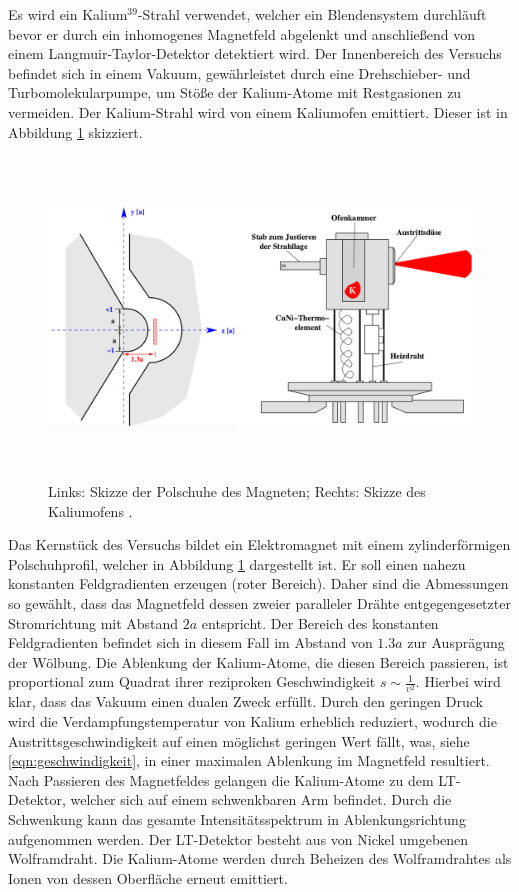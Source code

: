 Es wird ein Kalium$^{39}$-Strahl verwendet, welcher ein Blendensystem durchläuft bevor er durch ein inhomogenes Magnetfeld abgelenkt und anschließend von einem Langmuir-Taylor-Detektor detektiert wird.
Der Innenbereich des Versuchs befindet sich in einem Vakuum, gewährleistet durch eine Drehschieber- und Turbomolekularpumpe, um Stöße der Kalium-Atome mit Restgasionen zu vermeiden.
Der Kalium-Strahl wird von einem Kaliumofen emittiert.
Dieser ist in Abbildung \ref{fig:aufbau2} skizziert.
\begin{figure}
  \centering
  \includegraphics[height=8.5cm]{ressources/aufbau2.png}
  \caption{Links: Skizze der Polschuhe des Magneten; Rechts: Skizze des Kaliumofens \cite{skript}.}
  \label{fig:aufbau2}
\end{figure}
Das Kernstück des Versuchs bildet ein Elektromagnet mit einem zylinderförmigen Polschuhprofil, welcher in Abbildung \ref{fig:aufbau2} dargestellt ist.
Er soll einen nahezu konstanten Feldgradienten erzeugen (roter Bereich).
Daher sind die Abmessungen so gewählt, dass das Magnetfeld dessen zweier paralleler Drähte entgegengesetzter Stromrichtung mit Abstand $2a$ entspricht.
Der Bereich des konstanten Feldgradienten befindet sich in diesem Fall im Abstand von $1.3a$ zur Ausprägung der Wölbung.
Die Ablenkung der Kalium-Atome, die diesen Bereich passieren, ist proportional zum Quadrat ihrer reziproken Geschwindigkeit $s\sim \frac{1}{v^2}$.
Hierbei wird klar, dass das Vakuum einen dualen Zweck erfüllt.
Durch den geringen Druck wird die Verdampfungstemperatur von Kalium erheblich reduziert, wodurch die Austrittsgeschwindigkeit auf einen möglichst geringen Wert fällt, was, siehe \eqref{eqn:geschwindigkeit}, in einer maximalen Ablenkung im Magnetfeld resultiert.\\
Nach Passieren des Magnetfeldes gelangen die Kalium-Atome zu dem LT-Detektor, welcher sich auf einem schwenkbaren Arm befindet.
Durch die Schwenkung kann das gesamte Intensitätsspektrum in Ablenkungsrichtung aufgenommen werden.
Der LT-Detektor besteht aus von Nickel umgebenen Wolframdraht.
Die Kalium-Atome werden durch Beheizen des Wolframdrahtes als Ionen von dessen Oberfläche erneut emittiert.
